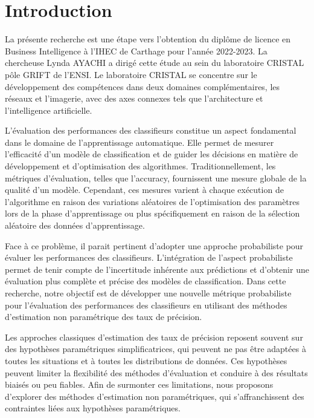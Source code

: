 
\chapter*{Introduction} 

La présente recherche est une étape vers l'obtention du diplôme de licence en Business Intelligence à l'IHEC de Carthage pour l'année 2022-2023. La chercheuse Lynda AYACHI a dirigé cette étude au sein du laboratoire CRISTAL pôle GRIFT de l'ENSI. Le laboratoire CRISTAL se concentre sur le développement des compétences dans deux domaines complémentaires, les réseaux et l'imagerie, avec des axes connexes tels que l'architecture et l'intelligence artificielle. 

L'évaluation des performances des classifieurs constitue un aspect fondamental dans le domaine de l'apprentissage automatique. Elle permet de mesurer l'efficacité d'un modèle de classification et de guider les décisions en matière de développement et d'optimisation des algorithmes. Traditionnellement, les métriques d'évaluation, telles que l'accuracy, fournissent une mesure globale de la qualité d'un modèle. Cependant, ces mesures varient à chaque exécution de l'algorithme en raison des variations aléatoires de l'optimisation des paramètres lors de la phase d'apprentissage ou plus spécifiquement en raison de la sélection aléatoire des données d'apprentissage.

Face à ce problème, il parait pertinent d'adopter une approche probabiliste pour évaluer les performances des classifieurs. L'intégration de l'aspect probabiliste permet de tenir compte de l'incertitude inhérente aux prédictions et d'obtenir une évaluation plus complète et précise des modèles de classification. Dans cette recherche, notre objectif est de développer une nouvelle métrique probabiliste pour l'évaluation des performances des classifieurs en utilisant des méthodes d'estimation non paramétrique des taux de précision.

Les approches classiques d'estimation des taux de précision reposent souvent sur des hypothèses paramétriques simplificatrices, qui peuvent ne pas être adaptées à toutes les situations et à toutes les distributions de données. Ces hypothèses peuvent limiter la flexibilité des méthodes d'évaluation et conduire à des résultats biaisés ou peu fiables. Afin de surmonter ces limitations, nous proposons d'explorer des méthodes d'estimation non paramétriques, qui s'affranchissent des contraintes liées aux hypothèses paramétriques.

